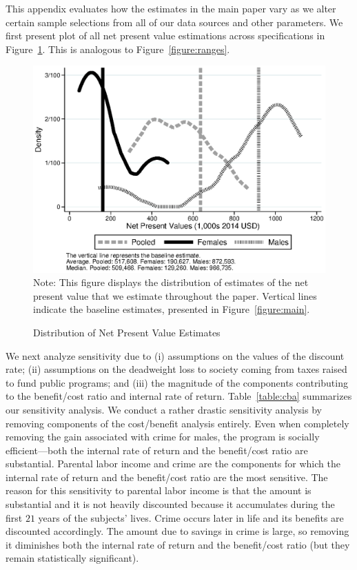 \noindent This appendix evaluates how the estimates in the main paper vary as we alter certain sample selections from all of our data sources and other parameters. We first present plot of all net present value estimations across specifications in Figure~\ref{figure:ranges-NPV}. This is analogous to Figure~\ref{figure:ranges}.

\begin{figure}[H]
\centering
\caption{Distribution of Net Present Value Estimates}\label{figure:ranges-NPV}
\includegraphics[width=\textwidth]{output/overalldist_npv}
\footnotesize \justify
Note: This figure displays the distribution of estimates of the net present value that we estimate throughout the paper. Vertical lines indicate the baseline estimates, presented in Figure~\ref{figure:main}. 
\end{figure}

\noindent We next analyze sensitivity due to (i) assumptions on the values of the discount rate; (ii) assumptions on the deadweight loss to society coming from taxes raised to fund public programs; and (iii) the magnitude of the components contributing to the benefit/cost ratio and internal rate of return. Table~\ref{table:cba} summarizes our sensitivity analysis. We conduct a rather drastic sensitivity analysis by removing components of the cost/benefit analysis entirely. Even when completely removing the gain associated with crime for males, the program is socially efficient---both the internal rate of return and the benefit/cost ratio are substantial. Parental labor income and crime are the components for which the internal rate of return and the benefit/cost ratio are the most sensitive. The reason for this sensitivity to parental labor income is that the amount is substantial and it is not heavily discounted because it accumulates during the first $21$ years of the subjects' lives. Crime occurs later in life and its benefits are discounted accordingly. The amount due to savings in crime is large, so removing it diminishes both the internal rate of return and the benefit/cost ratio (but they remain statistically significant).

